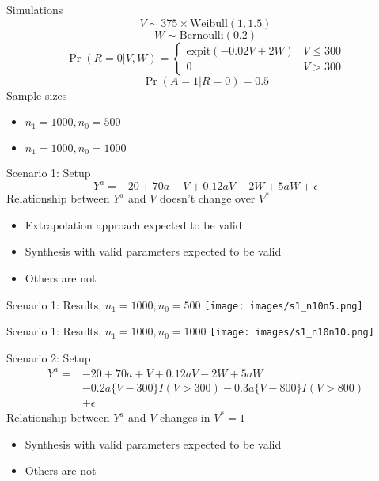 \documentclass{beamer}
\begin{document}
\begin{frame}{Simulations}
	\[V \sim 375 \times \text{Weibull}(1, 1.5)\]
	\[W \sim \text{Bernoulli}(0.2)\]
	\[\Pr(R=0 | V,W) = 
	\begin{cases}
		\text{expit}(-0.02 V+ 2W) & V \le 300 \\
		0                         & V > 300
	\end{cases}\]
	\[\Pr(A=1 | R=0) = 0.5\]
	Sample sizes
	\begin{itemize}
		\item $n_1 = 1000, n_0 = 500$
		\item $n_1 = 1000, n_0 = 1000$		
	\end{itemize}
\end{frame}

\begin{frame}{Scenario 1: Setup}
	\[Y^a = -20 + 70a + V + 0.12aV - 2W + 5aW + \epsilon\]
	Relationship between $Y^a$ and $V$ doesn't change over $V^*$
	\begin{itemize}
		\item Extrapolation approach expected to be valid
		\item Synthesis with valid parameters expected to be valid
		\item Others are not
	\end{itemize}
\end{frame}

\begin{frame}{Scenario 1: Results, $n_1 = 1000,n_0 = 500$}
	\centering
	\texttt{[image: images/s1\_n10n5.png]}
\end{frame}

\begin{frame}{Scenario 1: Results, $n_1 = 1000,n_0 = 1000$}
	\centering
	\texttt{[image: images/s1\_n10n10.png]}
\end{frame}

\begin{frame}{Scenario 2: Setup}
	\begin{equation*}
		\begin{split}
			Y^a = & -20 + 70a + V + 0.12aV - 2W + 5aW \\
			& - 0.2a \{V-300\} I(V>300) - 0.3a \{V-800\} I(V>800) \\
			& + \epsilon
		\end{split}
	\end{equation*}
	Relationship between $Y^a$ and $V$ changes in $V^* = 1$
	\begin{itemize}
		\item Synthesis with valid parameters expected to be valid
		\item Others are not
	\end{itemize}
\end{frame}
\end{document}
